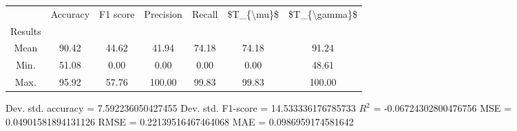 \begin{tabular}{|c|c|c|c|c|c|c|}
\toprule
{} &  Accuracy &  F1 score &  Precision &  Recall &  \$T\_\{\textbackslash mu\}\$ &  \$T\_\{\textbackslash gamma\}\$ \\
Results &           &           &            &         &            &               \\
\hline
Mean    &     90.42 &     44.62 &      41.94 &   74.18 &      74.18 &         91.24 \\
Min.    &     51.08 &      0.00 &       0.00 &    0.00 &       0.00 &         48.61 \\
Max.    &     95.92 &     57.76 &     100.00 &   99.83 &      99.83 &        100.00 \\
\bottomrule
\end{tabular}

 Dev. std. accuracy = 7.592236050427455
 Dev. std. F1-score = 14.533336176785733
 $R^2$ = -0.06724302800476756
 MSE = 0.04901581894131126
 RMSE = 0.22139516467464068
 MAE = 0.0986959174581642